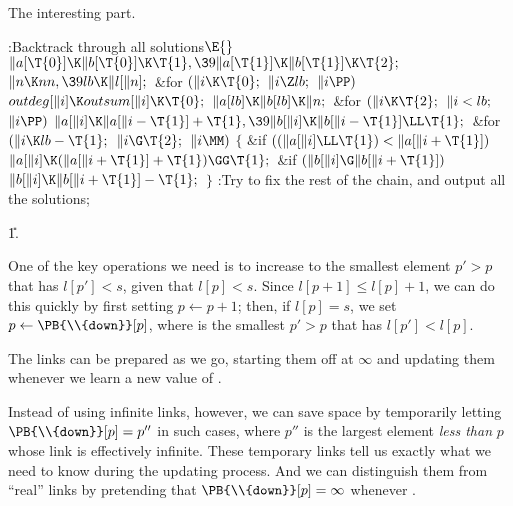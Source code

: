 The interesting part.

\Y\B\4:Backtrack through all solutions\X${}\E{}$\6
$\|a[\T{0}]\K\|b[\T{0}]\K\T{1},\39\|a[\T{1}]\K\|b[\T{1}]\K\T{2};{}$\6
${}\|n\K\\{nn},\39\\{lb}\K\|l[\|n];{}$\6
\&{for} ${}(\|i\K\T{0};{}$ ${}\|i\Z\\{lb};{}$ ${}\|i\PP){}$\1\5
${}\\{outdeg}[\|i]\K\\{outsum}[\|i]\K\T{0};{}$\2\6
${}\|a[\\{lb}]\K\|b[\\{lb}]\K\|n;{}$\6
\&{for} ${}(\|i\K\T{2};{}$ ${}\|i<\\{lb};{}$ ${}\|i\PP){}$\1\5
${}\|a[\|i]\K\|a[\|i-\T{1}]+\T{1},\39\|b[\|i]\K\|b[\|i-\T{1}]\LL\T{1};{}$\2\6
\&{for} ${}(\|i\K\\{lb}-\T{1};{}$ ${}\|i\G\T{2};{}$ ${}\|i\MM){}$\5
${}\{{}$\1\6
\&{if} ${}((\|a[\|i]\LL\T{1})<\|a[\|i+\T{1}]){}$\1\5
${}\|a[\|i]\K(\|a[\|i+\T{1}]+\T{1})\GG\T{1};{}$\2\6
\&{if} ${}(\|b[\|i]\G\|b[\|i+\T{1}]){}$\1\5
${}\|b[\|i]\K\|b[\|i+\T{1}]-\T{1};{}$\2\6
\4${}\}{}$\2\6
:Try to fix the rest of the chain, and output all the solutions\X;\par
\U1.\fi

One of the key operations we need is to increase  to the smallest
element $p'>p$ that has $l[p']<s$, given that $l[p]<s$. Since
$l[p+1]\le l[p]+1$, we can do this quickly by first setting $p\gets p+1$;
then, if $l[p]=s$, we set $p\gets\PB{\\{down}}[p]$, where  is
the
smallest $p'>p$ that has $l[p']<l[p]$.

The links  can be prepared as we go, starting them off at $%
\infty$
and updating them whenever we learn a new value of .

Instead of using infinite links, however, we can save space by
temporarily letting $\PB{\\{down}}[p]=p''$ in such cases, where $p''$ is the
largest element {\it less than\/} $p$ whose  link is effectively
infinite. These temporary links tell us exactly what we need to know during
the updating process. And we can distinguish them from ``real'' 
links by pretending that $\PB{\\{down}}[p]=\infty$ whenever .

